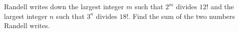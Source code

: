 Randell writes down the largest integer $m$ such that $2^m$ divides $12!$ and the largest integer $n$ such that $3^n$ divides $18!$. Find the sum of the two numbers Randell writes.
